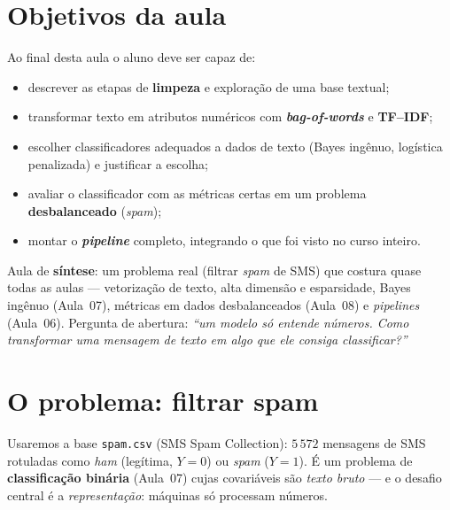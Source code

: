 \documentclass[11pt,a4paper]{article}
\begin{document}

\section*{Objetivos da aula}
Ao final desta aula o aluno deve ser capaz de:
\begin{itemize}[leftmargin=1.4cm]
  \item descrever as etapas de \textbf{limpeza} e exploração de uma base textual;
  \item transformar texto em atributos numéricos com \textbf{\emph{bag-of-words}} e
        \textbf{TF--IDF};
  \item escolher classificadores adequados a dados de texto (Bayes ingênuo,
        logística penalizada) e justificar a escolha;
  \item avaliar o classificador com as métricas certas em um problema
        \textbf{desbalanceado} (\emph{spam});
  \item montar o \textbf{\emph{pipeline}} completo, integrando o que foi visto no
        curso inteiro.
\end{itemize}

\begin{emsala}
Aula de \textbf{síntese}: um problema real (filtrar \emph{spam} de SMS) que costura
quase todas as aulas --- vetorização de texto, alta dimensão e esparsidade,
Bayes ingênuo (Aula~07), métricas em dados desbalanceados (Aula~08) e
\emph{pipelines} (Aula~06). Pergunta de abertura: \emph{``um modelo só entende
números. Como transformar uma mensagem de texto em algo que ele consiga
classificar?''}
\end{emsala}

\section{O problema: filtrar spam}
Usaremos a base \texttt{spam.csv} (SMS Spam Collection): $5\,572$ mensagens de
SMS rotuladas como \emph{ham} (legítima, $Y=0$) ou \emph{spam} ($Y=1$). É um problema
de \textbf{classificação binária} (Aula~07) cujas covariáveis são \emph{texto bruto}
--- e o desafio central é a \emph{representação}: máquinas só processam números.
\end{document}
